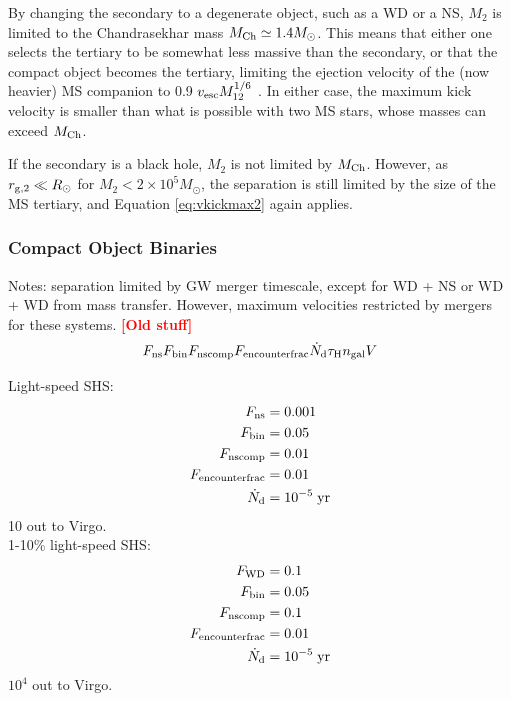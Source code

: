 \documentclass[a4paper,twocolumn]{emulateapj}
\newcommand{\colr}[1]{{\bf \textcolor{red}{[#1]}}}
\begin{document}
By changing the secondary to a degenerate object, such as a WD or a NS, $M_{2}$ is limited to the Chandrasekhar mass $M_{\rm Ch} \simeq 1.4 M_{\odot}$. This means that either one selects the tertiary to be somewhat less massive than the secondary, or that the compact object becomes the tertiary, limiting the ejection velocity of the (now heavier) MS companion to 0.9 $v_{\rm esc} M_{12}^{1/6}$ \citep{Sari:2010de}. In either case, the maximum kick velocity is smaller than what is possible with two MS stars, whose masses can exceed $M_{\rm Ch}$.

If the secondary is a black hole, $M_{2}$ is not limited by $M_{\rm Ch}$. However, as $r_{\rm g,2} \ll R_{\odot}$ for $M_{2} < 2 \times 10^{5} M_{\odot}$, the separation is still limited by the size of the MS tertiary, and Equation \ref{eq:vkickmax2} again applies.

\subsubsection{Compact Object Binaries}
Notes: separation limited by GW merger timescale, except for WD + NS or WD + WD from mass transfer. However, maximum velocities restricted by mergers for these systems.
\colr{Old stuff}
\begin{equation}
F_{\rm ns} F_{\rm bin} F_{\rm ns comp} F_{\rm encounterfrac} \dot{N}_{\rm d} \tau_{\rm H} n_{\rm gal} V
\end{equation}

Light-speed SHS:
\begin{align}
F_{\rm ns} &= 0.001\\
F_{\rm bin} &= 0.05\\
F_{\rm ns comp} &= 0.01\\
F_{\rm encounterfrac} &= 0.01\\
\dot{N}_{\rm d} &= 10^{-5}\;{\rm yr}
\end{align}
10 out to Virgo.\\

1-10\% light-speed SHS:
\begin{align}
F_{\rm WD} &= 0.1\\
F_{\rm bin} &= 0.05\\
F_{\rm ns comp} &= 0.1\\
F_{\rm encounterfrac} &= 0.01\\
\dot{N}_{\rm d} &= 10^{-5}\;{\rm yr}
\end{align}
$10^4$ out to Virgo.
\end{document}
